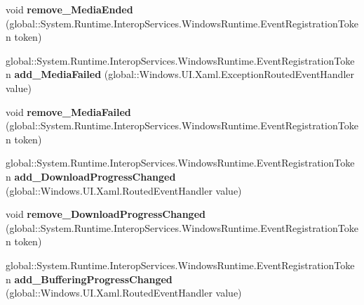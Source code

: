 \begin{DoxyCompactItemize}
\item 
\mbox{\label{class_windows_1_1_u_i_1_1_xaml_1_1_controls_1_1_media_element_a67a8ce04e034477b3b3042593f1a0009}} 
void {\bfseries remove\+\_\+\+Media\+Ended} (global\+::\+System.\+Runtime.\+Interop\+Services.\+Windows\+Runtime.\+Event\+Registration\+Token token)
\item 
\mbox{\label{class_windows_1_1_u_i_1_1_xaml_1_1_controls_1_1_media_element_aed63a8c47ee93be1333407e7b09e4594}} 
global\+::\+System.\+Runtime.\+Interop\+Services.\+Windows\+Runtime.\+Event\+Registration\+Token {\bfseries add\+\_\+\+Media\+Failed} (global\+::\+Windows.\+U\+I.\+Xaml.\+Exception\+Routed\+Event\+Handler value)
\item 
\mbox{\label{class_windows_1_1_u_i_1_1_xaml_1_1_controls_1_1_media_element_a22a64926578aa6a1496c7fe3f1f3dd97}} 
void {\bfseries remove\+\_\+\+Media\+Failed} (global\+::\+System.\+Runtime.\+Interop\+Services.\+Windows\+Runtime.\+Event\+Registration\+Token token)
\item 
\mbox{\label{class_windows_1_1_u_i_1_1_xaml_1_1_controls_1_1_media_element_a8050dc9cb01fd89c3bb3aaa30fce71e9}} 
global\+::\+System.\+Runtime.\+Interop\+Services.\+Windows\+Runtime.\+Event\+Registration\+Token {\bfseries add\+\_\+\+Download\+Progress\+Changed} (global\+::\+Windows.\+U\+I.\+Xaml.\+Routed\+Event\+Handler value)
\item 
\mbox{\label{class_windows_1_1_u_i_1_1_xaml_1_1_controls_1_1_media_element_af48fd901cd255c7b2f1ea0a9d21f9192}} 
void {\bfseries remove\+\_\+\+Download\+Progress\+Changed} (global\+::\+System.\+Runtime.\+Interop\+Services.\+Windows\+Runtime.\+Event\+Registration\+Token token)
\item 
\mbox{\label{class_windows_1_1_u_i_1_1_xaml_1_1_controls_1_1_media_element_a3b5145330cca79ed48d73975a1d80841}} 
global\+::\+System.\+Runtime.\+Interop\+Services.\+Windows\+Runtime.\+Event\+Registration\+Token {\bfseries add\+\_\+\+Buffering\+Progress\+Changed} (global\+::\+Windows.\+U\+I.\+Xaml.\+Routed\+Event\+Handler value)

\end{DoxyCompactItemize}
